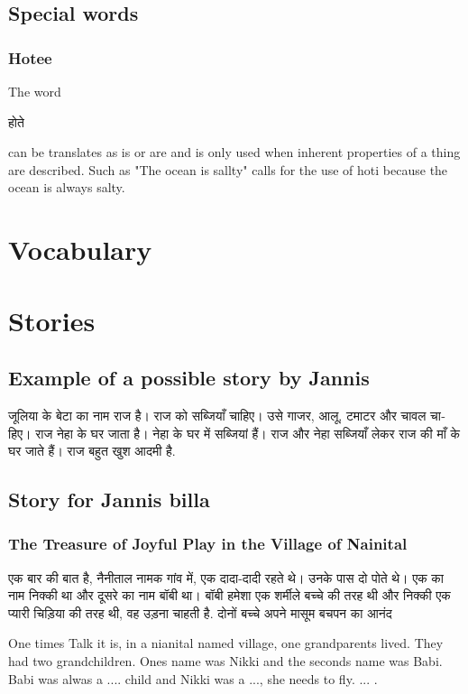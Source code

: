 \documentclass[12pt]{scrartcl}
\begin{document}
\subsection{Special words}
\subsubsection{Hotee}
	The word \begin{hindi}होते   \end{hindi} can be translates as is or are and is only used when inherent properties of a thing are described. Such as "The ocean is sallty" calls for the use of hoti because the ocean is always salty.


\newpage 
\section{Vocabulary}


\section{Stories}
\subsection{Example of a possible story by Jannis}



\begin{hindi}
जूलिया के बेटा का नाम राज है।
राज को सब्जियाँ चाहिए।
उसे गाजर, आलू, टमाटर और चावल चाहिए।
राज नेहा के घर जाता है।
नेहा के घर में सब्जियां हैं।
राज और नेहा सब्जियाँ लेकर राज की माँ के घर जाते हैं।
राज बहुत खुश आदमी है.
\end{hindi}

\subsection{Story for Jannis billa}
\subsubsection{The Treasure of Joyful Play in the Village of Nainital}


\begin{hindi}
एक बार की बात है, नैनीताल नामक गांव में, एक दादा-दादी रहते थे। उनके पास दो पोते थे। एक का नाम निक्की था और दूसरे का नाम बॉबी था। बॉबी हमेशा एक शर्मीले बच्चे की तरह थी और निक्की एक प्यारी चिड़िया की तरह थी, वह उड़ना चाहती है. दोनों बच्चे अपने मासूम बचपन का आनंद \end{hindi}


One times Talk it is, in a nianital named village, one grandparents lived. They had two grandchildren. Ones name was Nikki and the seconds name was Babi. Babi was alwas a .... child and Nikki was a ..., she needs to fly. ... .
\end{document}
